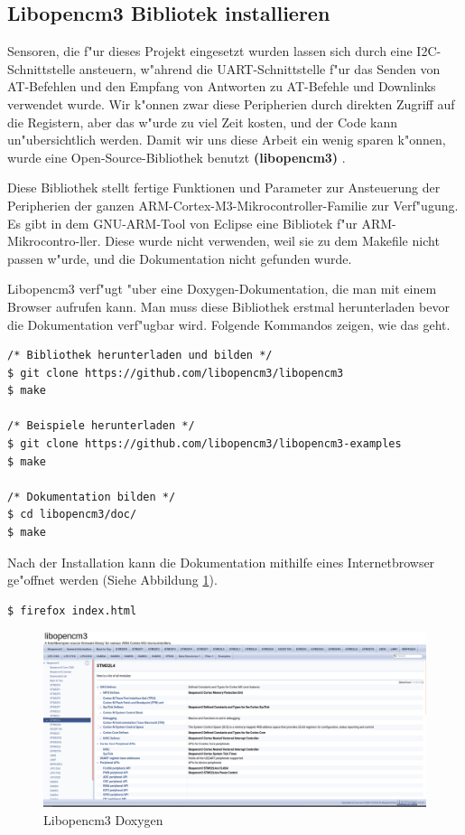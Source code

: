 \subsection{Libopencm3 Bibliotek installieren}
Sensoren, die f"ur dieses Projekt eingesetzt wurden lassen sich durch 
eine I2C-Schnittstelle ansteuern, w"ahrend die UART-Schnittstelle f"ur 
das Senden von AT-Befehlen und den Empfang von Antworten zu AT-Befehle 
und Downlinks verwendet wurde. Wir k"onnen zwar diese 
Peripherien durch direkten Zugriff auf die Registern, aber das w"urde zu 
viel Zeit kosten, und der Code kann un"ubersichtlich werden. Damit wir 
uns diese Arbeit ein wenig sparen k"onnen, wurde eine Open-Source-Bibliothek 
benutzt \textbf{(libopencm3)} \cite{lib}. 

Diese Bibliothek stellt fertige Funktionen und Parameter zur 
Ansteuerung der Peripherien der ganzen 
ARM-Cortex-M3-Mikrocontroller-Familie zur Verf"ugung. 
Es gibt in dem GNU-ARM-Tool von Eclipse eine Bibliotek f"ur ARM-Mikrocontro-ller.
Diese wurde nicht verwenden, weil sie zu dem Makefile nicht 
passen w"urde, und die Dokumentation nicht gefunden wurde. 

Libopencm3 verf"ugt "uber eine Doxygen-Dokumentation, die man mit 
einem Browser aufrufen kann. Man muss diese Bibliothek erstmal 
herunterladen bevor die Dokumentation verf"ugbar wird. Folgende
Kommandos zeigen, wie das geht.

\vspace{5cm}

\begin{lstlisting}[frame=single]
/* Bibliothek herunterladen und bilden */
$ git clone https://github.com/libopencm3/libopencm3 
$ make

/* Beispiele herunterladen */
$ git clone https://github.com/libopencm3/libopencm3-examples 
$ make

/* Dokumentation bilden */
$ cd libopencm3/doc/ 
$ make 

\end{lstlisting}

Nach der Installation kann die Dokumentation mithilfe eines 
Internetbrowser ge"offnet werden (Siehe Abbildung \ref{fig:Lib}).
\begin{lstlisting}[frame=single]
$ firefox index.html 
\end{lstlisting}

\begin{figure}[h]
	\centering
	\includegraphics[width=16cm]{source/images/Lib}
	\caption{Libopencm3 Doxygen\label{fig:Lib}}
\end{figure}

